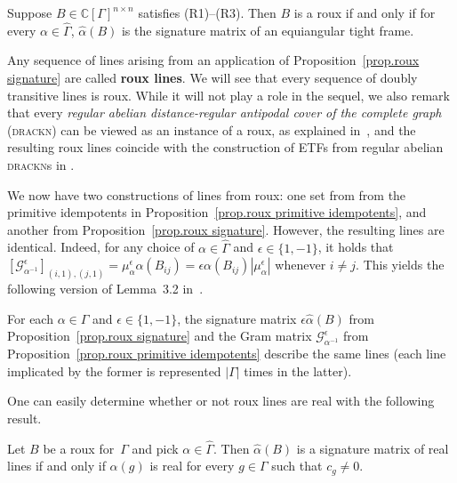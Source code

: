 \begin{proposition}
\label{prop.roux signature}
Suppose $B\in\mathbb{C}[\Gamma]^{n\times n}$ satisfies (R1)--(R3).
Then $B$ is a roux if and only if for every $\alpha\in\hat{\Gamma}$, $\hat\alpha(B)$ is the signature matrix of an equiangular tight frame.
\end{proposition}

Any sequence of lines arising from an application of Proposition~\ref{prop.roux signature} are called \textbf{roux lines}.
We will see that every sequence of doubly transitive lines is roux.
While it will not play a role in the sequel, we also remark that every \textit{regular abelian distance-regular antipodal cover of the complete graph} (\textsc{drackn}) can be viewed as an instance of a roux, as explained in~\cite{IversonM:18}, and the resulting roux lines coincide with the construction of ETFs from regular abelian \textsc{drackn}s in \cite{GodsilHensel:92,CoutinhoGSZ:16}. 

We now have two constructions of lines from roux: one set from from the primitive idempotents in Proposition~\ref{prop.roux primitive idempotents}, and another from Proposition~\ref{prop.roux signature}.
However, the resulting lines are identical.
Indeed, for any choice of $\alpha \in \hat{\Gamma}$ and $\epsilon \in \{1,-1\}$, it holds that $[\mathcal{G}_{\alpha^{-1}}^\epsilon]_{(i,1),(j,1)} = \mu_{\alpha}^\epsilon \alpha(B_{ij})=\epsilon \alpha(B_{ij}) |\mu_{\alpha}^\epsilon|$ whenever $i \neq j$.
This yields the following version of Lemma~3.2 in~\cite{IversonM:18}.


\begin{proposition}
\label{prop.two reps of same lines}
For each $\alpha\in\hat\Gamma$ and $\epsilon \in \{1,-1\}$, the signature matrix $\epsilon \hat{\alpha}(B)$ from Proposition~\ref{prop.roux signature} and the Gram matrix $\mathcal{G}_{\alpha^{-1}}^\epsilon$ from Proposition~\ref{prop.roux primitive idempotents} describe the same lines (each line implicated by the former is represented $|\Gamma|$ times in the latter).
\end{proposition}

One can easily determine whether or not roux lines are real with the following result.

\begin{proposition}
\label{prop.real line detector}
Let $B$ be a roux for~$\Gamma$ and pick $\alpha\in\hat\Gamma$.
Then $\hat\alpha(B)$ is a signature matrix of real lines if and only if $\alpha(g)$ is real for every $g\in\Gamma$ such that $c_g\neq0$.
\end{proposition}

